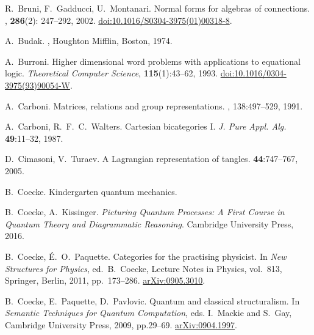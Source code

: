 \begin{thebibliography}{RSW00}
    R.\ Bruni, F.\ Gadducci, U.\ Montanari.
    \newblock Normal forms for algebras of connections.
    , {\bf 286}(2): 247--292, 2002. 
    \newblock \href{http://dx.doi.org/10.1016/S0304-3975(01)00318-8}{doi:10.1016/S0304-3975(01)00318-8}.

    A.\ Budak.
    , Houghton Mifflin, Boston, 1974.

    A.\ Burroni.
    \newblock Higher dimensional word problems with
    applications to equational logic.
    \newblock \textsl{Theoretical Computer Science}, {\bf 115}(1):43--62, 1993.
    \newblock \href{http://dx.doi.org/10.1016/0304-3975(93)90054-W}{doi:10.1016/0304-3975(93)90054-W}.



    A.\ Carboni.
    \newblock Matrices, relations and group representations.
    , 138:497--529, 1991.

    A.\ Carboni, R.\ F.\ C.\ Walters.
    \newblock Cartesian bicategories I.
    \newblock \textsl{J. Pure Appl. Alg.} {\bf 49}:11--32, 1987. 

    D.\ Cimasoni, V.\ Turaev.
    \newblock A Lagrangian representation of tangles.
     {\bf 44}:747--767, 2005.
    
    B.\ Coecke.
    \newblock Kindergarten quantum mechanics.
    
    
    B.\ Coecke, A.\ Kissinger.
    \newblock \textsl{Picturing Quantum Processes: A First Course in Quantum Theory and Diagrammatic Reasoning}.
    \newblock Cambridge University Press, 2016.

    B.\ Coecke, \'E.\ O.\ Paquette.
    \newblock Categories for the practising physicist.
    \newblock In {\sl New Structures for Physics}, ed.\ B.\ Coecke,  
    Lecture Notes in Physics, vol.\ 813, Springer, Berlin, 2011, pp.\ 173--286.
    \newblock \href{http://arxiv.org/abs/0905.3010}{arXiv:0905.3010}.

    B.\ Coecke, E.\ Paquette, D.\ Pavlovic.
    \newblock Quantum and classical structuralism.
    \newblock In \textsl{Semantic Techniques for Quantum
    Computation}, eds. I.\ Mackie and S.\ Gay, Cambridge University Press, 2009,
    pp.29--69.
    \newblock \href{http://arxiv.org/abs/0904.1997}{arXiv:0904.1997}.


\end{thebibliography}
